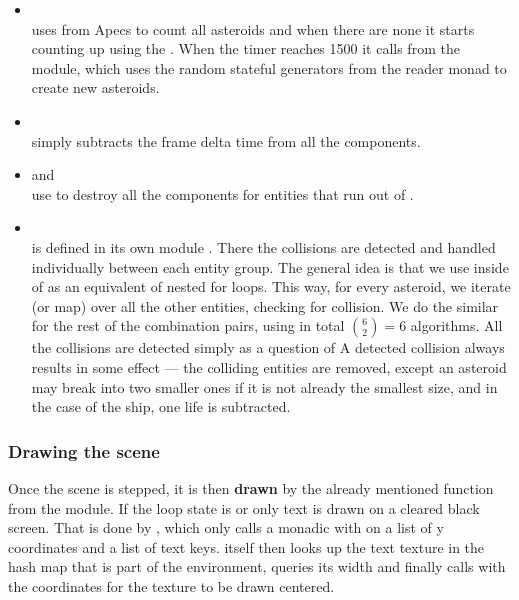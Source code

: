 \documentclass[
  digital, %
  color,   %
  table,   %
  oneside, %
  lof,     %
  lot,     %
]{fithesis3}
\begin{document}
\begin{itemize}[\textendash]
    \item {}\\
    uses  from Apecs to count all asteroids and
    when there are none it starts counting up using the .
    When the timer reaches 1500 it calls 
    from the  module, which uses the random stateful
    generators from the  reader monad to create new asteroids.

    \item {}\\
    simply subtracts the frame delta time  from all the
     components.

    \item {} and \\
    use  to destroy all the components for entities that run out of .

    \item {}\\
    is defined in its own module .
    There the collisions are detected and handled individually between each
    entity group. The general idea is that we use  inside of 
    as an equivalent of nested for loops. This way, for every asteroid,
    we iterate (or map) over all the other entities, checking for collision.
    We do the similar for the rest of the combination pairs,
    using in total $\binom{6}{2} = 6$ algorithms. All the collisions are detected
    simply as a question of  A detected collision always results in some effect
    --- the colliding entities are removed, except an asteroid may break into two
    smaller ones if it is not already the smallest size, and
    in the case of the ship, one life is subtracted.
\end{itemize}

\subsubsection{\textbf{Drawing the scene}}
Once the scene is stepped, it is then \textbf{drawn} by the already mentioned 
function from the  module. If the loop state is  or
 only text is drawn on a cleared black screen. That is done by
, which only calls a monadic  with
 on a list of y coordinates and a list of text keys.
 itself then looks up the text texture in the
hash map that is part of the  environment,
queries its width and finally calls  with the coordinates
for the texture to be drawn centered.
\end{document}
